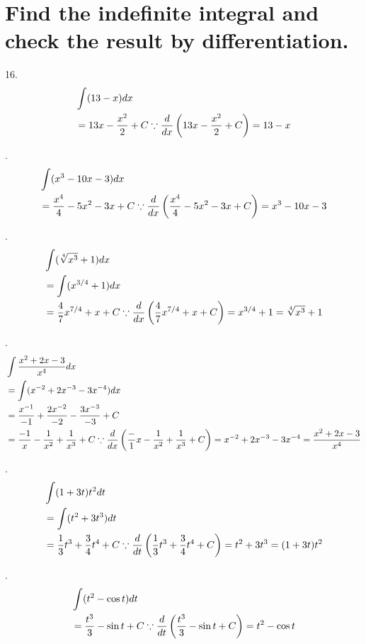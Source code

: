 \documentclass[11pt]{article}
\newcommand*{\vs}{\vspace{1cm}}
\newcommand*{\next}{\noindent}
\newcommand*{\set}{\setcounter{equation}{0}}
\begin{document}
\section{Find the indefinite integral and check the result by differentiation.}
16.\begin{align}
    \set
    &\int(13-x)dx\\
    &=13x-\frac{x^2}{2}+C\because\frac{d}{dx}\left(13x-\frac{x^2}{2}+C\right)=13-x
\end{align}

\vs\next
20.\begin{align}
    \set
    &\int(x^3-10x-3)dx\\
    &=\frac{x^4}{4}-5x^2-3x+C\because\frac{d}{dx}\left(\frac{x^4}{4}-5x^2-3x+C\right)=x^3-10x-3
\end{align}

\vs\next
24.\begin{align}
    \set
    &\int(\sqrt[4]{x^3}+1)dx\\
    &=\int(x^{3/4}+1)dx\\
    &=\frac{4}{7}x^{7/4}+x+C\because\frac{d}{dx}\left(\frac{4}{7}x^{7/4}+x+C\right)=x^{3/4}+1=\sqrt[4]{x^3}+1
\end{align}

\vs\next
28.\begin{align}
    \set
    &\int\frac{x^2+2x-3}{x^4}dx\\
    &=\int(x^{-2}+2x^{-3}-3x^{-4})dx\\
    &=\frac{x^{-1}}{-1}+\frac{2x^{-2}}{-2}-\frac{3x^{-3}}{-3}+C\\
    &=\frac{-1}{x}-\frac{1}{x^2}+\frac{1}{x^3}+C\because\frac{d}{dx}\left(\frac-{1}{x}-\frac{1}{x^2}+\frac{1}{x^3}+C\right)=x^{-2}+2x^{-3}-3x^{-4}=\frac{x^2+2x-3}{x^4}
\end{align}

\vs\next
32.\begin{align}
    \set
    &\int(1+3t)t^2dt\\
    &=\int(t^2+3t^3)dt\\
    &=\frac{1}{3}t^3+\frac{3}{4}t^4+C\because\frac{d}{dt}\left(\frac{1}{3}t^3+\frac{3}{4}t^4+C\right)=t^2+3t^3=(1+3t)t^2
\end{align}

\vs\next
36.\begin{align}
    \set
    &\int(t^2-\cos t)dt\\
    &=\frac{t^3}{3}-\sin t+C\because\frac{d}{dt}\left(\frac{t^3}{3}-\sin t+C\right)=t^2-\cos t
\end{align}
\end{document}

